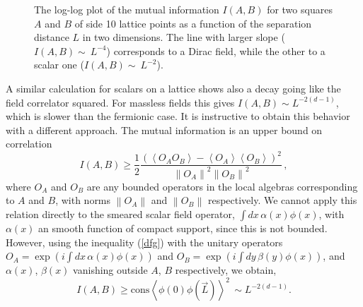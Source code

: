 \documentclass[a4paper]{article}
\begin{document}
\begin{figure} [tbp]
\centering
\leavevmode
\epsfysize=5.3cm
\bigskip
{}
\caption{The log-log plot of the mutual information $I(A,B)$ for two squares $A$ and $B$ of side 10 lattice points as a function of the separation distance $L$ in two dimensions. The line with larger slope ($I(A,B)\sim~L^{-4}$) corresponds to a Dirac field, while the other to a scalar one ($I(A,B)\sim~L^{-2}$).}
\end{figure}

A similar calculation for scalars on a lattice  shows also a decay going like the field correlator squared. For massless fields this gives $I(A,B)\sim L^{-2(d-1)}$, which is slower than the fermionic case. It is instructive to obtain this behavior with a different approach. The mutual information is an upper bound on correlation \cite{upper}
\begin{equation}
I(A,B)\ge \frac{1}{2}\frac{\left(\left<O_A O_B\right>-\left<O_A\right>\left<O_B\right>\right)^2}{\left\|O_A\right\|^2\left\|O_B\right\|^2}\label{dfg}\,,
\end{equation}
where $O_A$ and $O_B$ are any bounded operators in the local algebras corresponding to $A$ and $B$, with norms $\left\|O_A\right\|$ and $\left\|O_B\right\|$ respectively. We cannot apply this relation directly to the smeared scalar field operator, $\int dx \,\alpha(x) \phi(x)$, with $\alpha(x)$ an smooth function of compact support, since this is not bounded. However, using the inequality (\ref{dfg}) with the unitary operators $O_A=\exp{(i  \int dx \,\alpha(x) \phi(x))}$ and $O_B=\exp(i \int dy \, \beta(y) \phi(x))$, and $\alpha(x)$, $\beta(x)$ vanishing outside $A$, $B$ respectively, we obtain, 
\begin{equation}
I(A,B)\ge \textrm{cons} \left<\phi(0) \phi(\vec{L})\right>^2\,\sim L^{-2(d-1)}.
\end{equation} 
\end{document}
